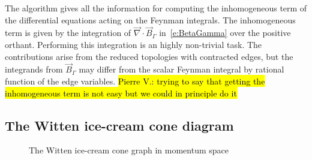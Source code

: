 \documentclass[a4paper,12pt]{article}
\numberwithin{equation}{section}
\numberwithin{figure}{section}
\newcommand{\pvnote}[1]{\sethlcolor{bubblegum} \protect\hl{Pierre V.: #1} \sethlcolor{yellow}}
\begin{document}
The algorithm gives all the information for computing the
inhomogeneous term of the differential equations acting on the Feynman
integrals. The inhomogeneous term  is given by the  integration of
$\vec\nabla\cdot \vec B_\Gamma$ in~\eqref{e:BetaGamma}  over the
positive orthant. Performing this integration is an highly non-trivial
task. The contributions arise from the reduced topologies with
contracted edges, but the integrands from $\vec B_\Gamma$ may differ
from the scalar Feynman integral by rational function of the edge
variables. \pvnote{trying to say that getting the inhomogeneous term
  is not easy but we could in principle do it}
\subsection{The Witten ice-cream cone diagram}\label{sec:Wittenicecream}


\begin{figure}\centering
{}
\caption{The Witten ice-cream cone graph in momentum space}
\end{figure}
\end{document}
